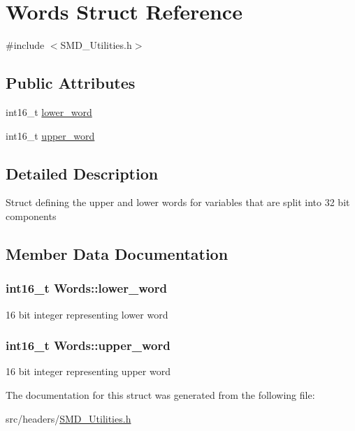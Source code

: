 \hypertarget{struct_words}{}\section{Words Struct Reference}
\label{struct_words}


{\ttfamily \#include $<$S\+M\+D\+\_\+\+Utilities.\+h$>$}

\subsection*{Public Attributes}
\begin{DoxyCompactItemize}
\item 
int16\+\_\+t \hyperlink{struct_words_a7fddef805a23dd29dfeee9975f17f09f}{lower\+\_\+word}
\item 
int16\+\_\+t \hyperlink{struct_words_ae99246a69859951d868050bb6ae2a34e}{upper\+\_\+word}
\end{DoxyCompactItemize}


\subsection{Detailed Description}
Struct defining the upper and lower words for variables that are split into 32 bit components 

\subsection{Member Data Documentation}
\hypertarget{struct_words_a7fddef805a23dd29dfeee9975f17f09f}{}
\subsubsection[{lower\+\_\+word}]{\setlength{\rightskip}{0pt plus 5cm}int16\+\_\+t Words\+::lower\+\_\+word}\label{struct_words_a7fddef805a23dd29dfeee9975f17f09f}
16 bit integer representing lower word \hypertarget{struct_words_ae99246a69859951d868050bb6ae2a34e}{}
\subsubsection[{upper\+\_\+word}]{\setlength{\rightskip}{0pt plus 5cm}int16\+\_\+t Words\+::upper\+\_\+word}\label{struct_words_ae99246a69859951d868050bb6ae2a34e}
16 bit integer representing upper word 

The documentation for this struct was generated from the following file\+:\begin{DoxyCompactItemize}
\item 
src/headers/\hyperlink{_s_m_d___utilities_8h}{S\+M\+D\+\_\+\+Utilities.\+h}\end{DoxyCompactItemize}
